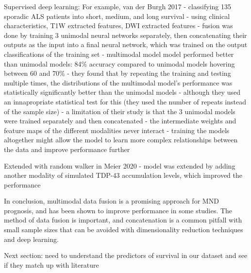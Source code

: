 Supervised deep learning:
For example, van der Burgh 2017
- classifying 135 sporadic ALS patients into short, medium, and long survival
- using clinical characteristics, T1W extracted features, DWI extracted features
- fusion was done by training 3 unimodal neural networks separately, then concatenating their outputs as the input into a final neural network, which was trained on the output classifications of the training set
- multimodal model model performed better than unimodal models: 84\% accuracy compared to unimodal models hovering between 60 and 70\%
- they found that by repeating the training and testing multiple times, the distributions of the multimodal model's performance was statistically significantly better than the unimodal models
    - although they used an innapropriate statistical test for this (they used the number of repeats instead of the sample size)
- a limitation of their study is that the 3 unimodal models were trained separately and then concatenated
    - the intermediate weights and feature maps of the different modalities never interact
    - training the models altogether might allow the model to learn more complex relationships between the data and improve performance further

Extended with random walker in Meier 2020
- model was extended by adding another modality of simulated TDP-43 accumulation levels, which improved the performance


In conclusion, multimodal data fusion is a promising approach for MND prognosis, and has been shown to improve performance in some studies.
The method of data fusion is important, and concatenation is a common pitfall with small sample sizes that can be avoided with dimensionality reduction techniques and deep learning.

Next section: need to understand the predictors of survival in our dataset and see if they match up with literature

